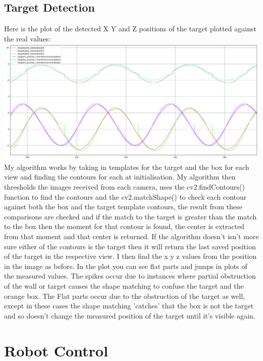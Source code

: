 \documentclass[12pt]{article}
\begin{document}
\subsection{Target Detection}
Here is the plot of the detected X Y and Z positions of the target plotted against the real values:\newline
\includegraphics[width=\textwidth]{target_tracker.png}
My algorithm works by taking in templates for the target and the box for each view and finding the contours for each at initialisation.
My algorithm then thresholds the images received from each camera, uses the cv2.findContours() function to find the contours and the cv2.matchShape() to check each contour against both the box and the target template contours, the result from these comparisons are checked and if the match to the target is greater than the match to the box then the moment for that contour is found, the center is extracted from that moment and that center is returned. If the algorithm doesn't isn't more sure either of the contours is the target then it will return the last saved position of the target in the respective view. I then find the x y z values from the position in the image as before. \newline
In the plot you can see flat parts and jumps in plots of the measured values. The spikes occur due to instances where partial obstruction of the wall or target causes the shape matching to confuse the target and the orange box. The Flat parts occur due to the obstruction of the target as well, except in these cases the shape matching 'catches' that the box is not the target and so doesn't change the measured position of the target until it's visible again.
\newpage
\section{Robot Control}
\end{document}
